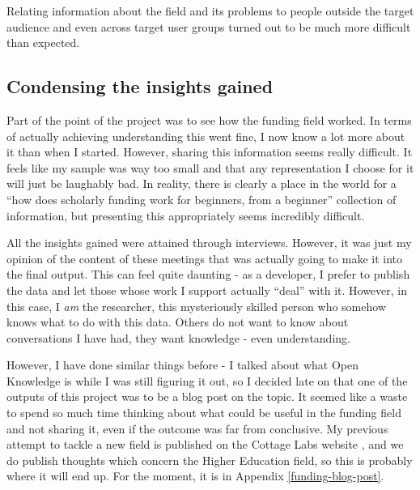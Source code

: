 
Relating information about the field and its problems to people outside the target audience and even across target user groups turned out to be much more difficult than expected.

\subsection{Condensing the insights gained}
Part of the point of the project was to see how the funding field worked. In terms of actually achieving understanding this went fine, I now know a lot more about it than when I started. However, sharing this information seems really difficult. It feels like my sample was way too small and that any representation I choose for it will just be laughably bad. In reality, there is clearly a place in the world for a ``how does scholarly funding work for beginners, from a beginner'' collection of information, but presenting this appropriately seems incredibly difficult.

All the insights gained were attained through interviews. However, it was just my opinion of the content of these meetings that was actually going to make it into the final output. This can feel quite daunting - as a developer, I prefer to publish the data and let those whose work I support actually ``deal'' with it. However, in this case, I \emph{am} the researcher, this mysteriously skilled person who somehow knows what to do with this data. Others do not want to know about conversations I have had, they want knowledge - even understanding.

However, I have done similar things before - I talked about what Open Knowledge is while I was still figuring it out, so I decided late on that one of the outputs of this project was to be a blog post on the topic. It seemed like a waste to spend so much time thinking about what could be useful in the funding field and not sharing it, even if the outcome was far from conclusive. My previous attempt to tackle a new field is published on the Cottage Labs website \cite{cl-emanuil}, and we do publish thoughts which concern the Higher Education field, so this is probably where it will end up. For the moment, it is in Appendix \ref{funding-blog-post}.

